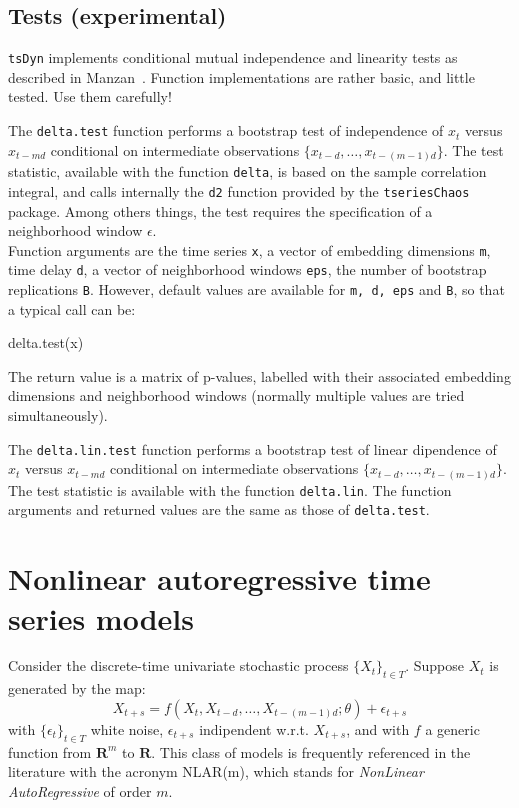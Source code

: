 \documentclass[a4paper]{article}
\newcommand{\tsDyn}{\texttt{tsDyn} }
\begin{document}
\subsection{Tests (experimental)}
\tsDyn implements conditional mutual independence and linearity tests as described in Manzan~\cite{Manzan2003}. Function implementations are rather basic, and little tested. Use them carefully!

The \texttt{delta.test} function performs a bootstrap test of independence of $x_t$ versus $x_{t-md}$ conditional on intermediate observations $\{x_{t-d}, \ldots, x_{t-(m-1)d}\}$. The test statistic, available with the function \texttt{delta}, is based on the sample correlation integral, and calls internally the \texttt{d2} function provided by the \texttt{tseriesChaos} package. Among others things, the test requires the specification of a neighborhood window $\epsilon$.\\
Function arguments are the time series \texttt{x}, a vector of
embedding dimensions \texttt{m}, time delay \texttt{d}, a vector of
neighborhood windows \texttt{eps}, the number of bootstrap
replications \texttt{B}. However, default values are available for
\texttt{m, d, eps} and \texttt{B}, so that a typical call can be:
\begin{Schunk}
\begin{Sinput}
 delta.test(x)
\end{Sinput}
\end{Schunk}
The return value is a matrix of p-values, labelled with their associated 
embedding dimensions and neighborhood windows (normally multiple values are tried simultaneously).

The \texttt{delta.lin.test} function performs a bootstrap test of linear dipendence of $x_t$ 
versus $x_{t-md}$ conditional on intermediate observations $\{x_{t-d}, \ldots, x_{t-(m-1)d}\}$. 
The test statistic is available with the function \texttt{delta.lin}. The function arguments 
and returned values are the same as those of \texttt{delta.test}.

\section{Nonlinear autoregressive time series models}
Consider the discrete-time univariate stochastic process $\{X_t\}_{t \in T}$.
Suppose $X_t$ is generated by the map:
\begin{equation}\label{eq:generalNLAR}
X_{t+s} = f(X_t, X_{t-d}, \ldots, X_{t-(m-1)d}; \theta) + \epsilon_{t+s}
\end{equation}
with $\{\epsilon_t\}_{t \in T}$ white noise, $\epsilon_{t+s}$ indipendent w.r.t. $X_{t+s}$, and with $f$ a generic function from $\mathbf{R}^m$ to $\mathbf{R}$.
This class of models is frequently referenced in the literature with the acronym NLAR(m), 
which stands for \emph{NonLinear AutoRegressive} of order $m$.
\end{document}
